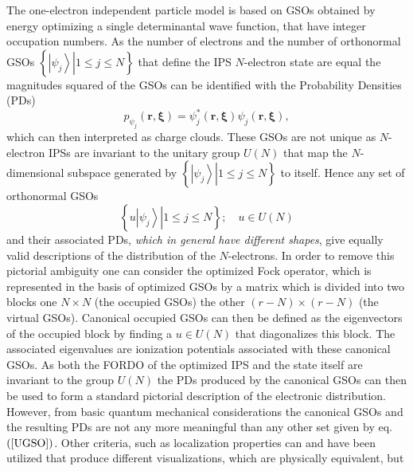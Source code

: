 \documentclass[aps,preprint]{revtex4}%
\begin{document}
The one-electron independent particle model is based on GSOs obtained by
energy optimizing a single determinantal wave function, that have integer
occupation numbers. As the number of electrons and the number of orthonormal
GSOs $\left\{  \left.  \left\vert \psi_{j}\right\rangle \right\vert 1\leq
j\leq N\right\}  $ that define the IPS $N$-electron state are equal the
magnitudes squared of the GSOs can be identified with the Probability
Densities (PDs)
\begin{equation}
p_{\psi_{j}}\left(  \boldsymbol{r},\boldsymbol{\xi}\right)  =\psi_{j}^{\ast
}\left(  \boldsymbol{r},\boldsymbol{\xi}\right)  \psi_{j}\left(
\boldsymbol{r},\boldsymbol{\xi}\right)  , \label{PD}%
\end{equation}
which can then interpreted as charge clouds. These GSOs are not unique as
$N$-electron IPSs are invariant to the unitary group $U\left(  N\right)  $
that map the $N$-dimensional subspace generated by $\left\{  \left.
\left\vert \psi_{j}\right\rangle \right\vert 1\leq j\leq N\right\}  $ to
itself. Hence any set of orthonormal GSOs
\begin{equation}
\left\{  \left.  u\left\vert \psi_{j}\right\rangle \right\vert 1\leq j\leq
N\right\}  ;\quad u\in U\left(  N\right)  \label{UGSO}%
\end{equation}
and their associated PDs, \emph{which in general have different shapes}, give
equally valid descriptions of the distribution of the $N$-electrons. In order
to remove this pictorial ambiguity one can consider the optimized Fock
operator, which is represented in the basis of optimized GSOs by a matrix
which is divided into two blocks one $N\times N$ (the occupied GSOs) the other
$\left(  r-N\right)  \times\left(  r-N\right)  $ (the virtual GSOs). Canonical
occupied GSOs can then be defined as the eigenvectors of the occupied block by
finding a $u\in U\left(  N\right)  $ that diagonalizes this block. The
associated eigenvalues are ionization potentials associated with these
canonical GSOs. As both the FORDO of the optimized IPS and the state itself
are invariant to the group $U\left(  N\right)  $ the PDs produced by the
canonical GSOs can then be used to form a standard pictorial description of
the electronic distribution. However, from basic quantum mechanical
considerations the canonical GSOs and the resulting PDs are not any more
meaningful than any other set given by eq. $\left(  \ref{UGSO}\right)  $.
Other criteria, such as localization properties can and have been utilized
that produce different visualizations, which are physically equivalent, but
\end{document}
